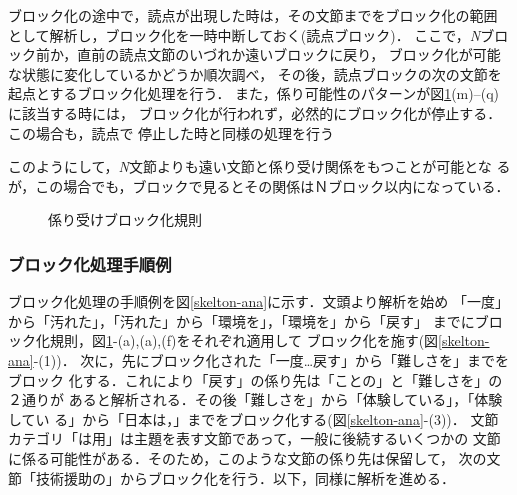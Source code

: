 ブロック化の途中で，読点が出現した時は，その文節までをブロック化の範囲
として解析し，ブロック化を一時中断しておく(読点ブロック)．
ここで，{\it N}ブロック前か，直前の読点文節のいづれか遠いブロックに戻り，
ブロック化が可能な状態に変化しているかどうか順次調べ，
その後，読点ブロックの次の文節を起点とするブロック化処理を行う．
また，係り可能性のパターンが図\ref{block-rule}(m)--(q)に該当する時には，
ブロック化が行われず，必然的にブロック化が停止する．この場合も，読点で
停止した時と同様の処理を行う

このようにして，{\it N}文節よりも遠い文節と係り受け関係をもつことが可能とな
るが，この場合でも，ブロックで見るとその関係はＮブロック以内になっている．

\begin{figure}[ht]
\vspace{-2mm}
\begin{center}
  
  \caption{係り受けブロック化規則}\label{block-rule}
\end{center}
\end{figure}
\vspace{-15mm}

\subsubsection{ブロック化処理手順例}
ブロック化処理の手順例を図\ref{skelton-ana}に示す．文頭より解析を始め
「一度」から「汚れた」，「汚れた」から「環境を」，「環境を」から「戻す」
までにブロック化規則，図\ref{block-rule}-(a),(a),(f)をそれぞれ適用して
ブロック化を施す(図\ref{skelton-ana}-(1))．
次に，先にブロック化された「一度…戻す」から「難しさを」までをブロック
化する．これにより「戻す」の係り先は「ことの」と「難しさを」の２通りが
あると解析される．その後「難しさを」から「体験している」，「体験してい
る」から「日本は，」までをブロック化する(図\ref{skelton-ana}-(3))．
文節カテゴリ「は用」は主題を表す文節であって，一般に後続するいくつかの
文節に係る可能性がある．そのため，このような文節の係り先は保留して，
次の文節「技術援助の」からブロック化を行う．以下，同様に解析を進める．

